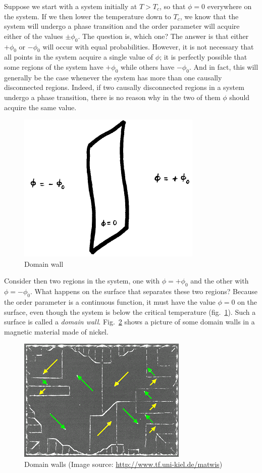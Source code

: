 \documentclass[11pt, a4paper,oneside,openright]{book}
\numberwithin{equation}{section}
\begin{document}
Suppose we start with a system initially at $T>T_c$, so that $\phi=0$ everywhere on the system. If we then lower the temperature down to $T_c$, we know that the system will undergo a phase transition and the order parameter will acquire either of the values $\pm\phi_0$. The question is, which one? The answer is that either $+\phi_0$ or $-\phi_0$ will occur with equal probabilities. However, it is not necessary that all points in the system acquire a single value of $\phi$; it is perfectly possible that some regions of the system have $+\phi_0$ while others have $-\phi_0$. And in fact, this will generally be the case whenever the system has more than one causally disconnected regions. Indeed, if two causally disconnected regions in a system undergo a phase transition, there is no reason why in the two of them $\phi$ should acquire the same value.
\begin{figure}[ht]
\begin{center}
\includegraphics[scale=0.6]{Draw/lec12_7.png}
\end{center}
\caption{Domain wall}
\label{fig:lec12_7}
\end{figure}

Consider then two regions in the system, one with $\phi=+\phi_0$ and the other with $\phi=-\phi_0$. What happens on the surface that separates these two regions? Because the order parameter is a continuous function, it must have the value $\phi=0$ on the surface, even though the system is below the critical temperature (fig.\ \ref{fig:lec12_7}). Such a surface is called a {\it domain wall}. Fig.\ \ref{fig:lec12_1} shows a picture of some domain walls in a magnetic material made of nickel.
\begin{figure}[ht]
\begin{center}
\includegraphics[scale=0.75]{Draw/lec12_1.png}
\end{center}
\caption{Domain walls (Image source: \url{http://www.tf.uni-kiel.de/matwis})}
\label{fig:lec12_1}
\end{figure}
\end{document}
